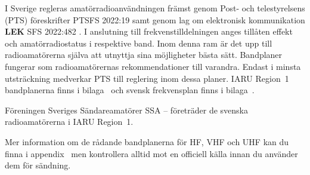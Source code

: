I Sverige regleras amatörradioanvändningen främst genom Post- och
telestyrelsens (PTS) föreskrifter PTSFS 2022:19 \cite{PTSFS2022:19} samt genom lag
om elektronisk kommunikation \textbf{LEK} SFS 2022:482 \cite{SFS2022:482}.
I anslutning till frekvenstilldelningen anges tillåten effekt och
amatörradiostatus i respektive band.
Inom denna ram är det upp till radioamatörerna själva att utnyttja sina
möjligheter bästa sätt.
Bandplaner fungerar som radioamatörernas rekommendationer till varandra.
Endast i minsta utsträckning medverkar PTS till reglering inom dessa planer.
IARU Region~1 bandplanerna finns i bilaga~ och svensk
frekvensplan finns i bilaga~.

Föreningen Sveriges Sändareamatörer SSA -- företräder de svenska
radioamatörerna i IARU Region~1.

Mer information om de rådande bandplanerna för HF, VHF och UHF kan du finna i
appendix~ men kontrollera alltid mot en officiell källa innan
du använder dem för sändning.
